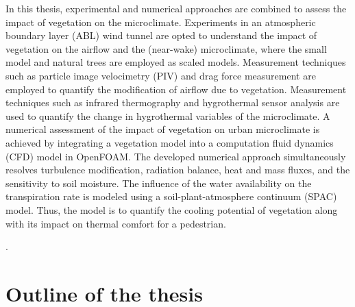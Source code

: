 In this thesis, experimental and numerical approaches are combined to assess the impact of vegetation on the microclimate. Experiments in an atmospheric boundary layer (ABL) wind tunnel are opted to understand the impact of vegetation on the airflow and the (near-wake) microclimate, where the small model and natural trees are employed as scaled models. Measurement techniques such as particle image velocimetry (PIV) and drag force measurement are employed to quantify the modification of airflow due to vegetation. Measurement techniques such as infrared thermography and hygrothermal sensor analysis are used to quantify the change in hygrothermal variables of the microclimate. A numerical assessment of the impact of vegetation on urban microclimate is achieved by integrating a vegetation model into a computation fluid dynamics (CFD) model in OpenFOAM. The developed numerical approach simultaneously resolves turbulence modification, radiation balance, heat and mass fluxes, and the sensitivity to soil moisture. The influence of the water availability on the transpiration rate is modeled using a soil-plant-atmosphere continuum (SPAC) model.  Thus, the model is to quantify the cooling potential of vegetation along with its impact on thermal comfort for a pedestrian.

.

\section{Outline of the thesis}

